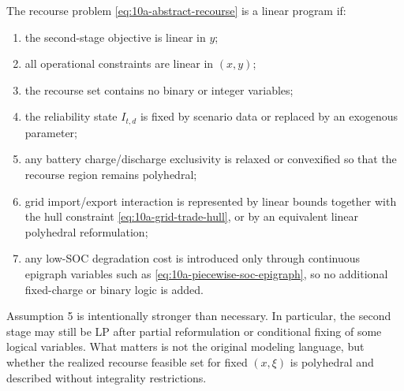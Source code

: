 \begin{assumption}
The recourse problem \eqref{eq:10a-abstract-recourse} is a linear program if:
\begin{enumerate}
  \item the second-stage objective is linear in \(y\);
  \item all operational constraints are linear in \((x,y)\);
  \item the recourse set contains no binary or integer variables;
  \item the reliability state \(I_{t,d}\) is fixed by scenario data or replaced by an exogenous parameter;
  \item any battery charge/discharge exclusivity is relaxed or convexified so that the recourse region remains polyhedral;
  \item grid import/export interaction is represented by linear bounds together with the hull constraint \eqref{eq:10a-grid-trade-hull}, or by an equivalent linear polyhedral reformulation;
  \item any low-SOC degradation cost is introduced only through continuous epigraph variables such as \eqref{eq:10a-piecewise-soc-epigraph}, so no additional fixed-charge or binary logic is added.
\end{enumerate}
\end{assumption}

Assumption 5 is intentionally stronger than necessary. In particular, the second stage may still be LP after partial reformulation or conditional fixing of some logical variables. What matters is not the original modeling language, but whether the realized recourse feasible set for fixed \((x,\xi)\) is polyhedral and described without integrality restrictions.

